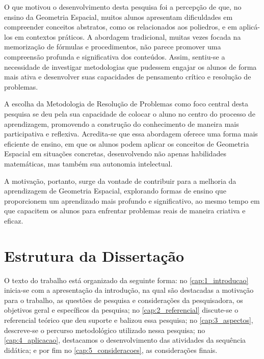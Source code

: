 O que motivou o desenvolvimento desta pesquisa foi a percepção de que, no ensino da Geometria Espacial, muitos alunos apresentam dificuldades em compreender conceitos abstratos, como os relacionados aos poliedros, e em aplicá-los em contextos práticos. A abordagem tradicional, muitas vezes focada na memorização de fórmulas e procedimentos, não parece promover uma compreensão profunda e significativa dos conteúdos. Assim, sentiu-se a necessidade de investigar metodologias que pudessem engajar os alunos de forma mais ativa e desenvolver suas capacidades de pensamento crítico e resolução de problemas.

A escolha da Metodologia de Resolução de Problemas como foco central desta pesquisa se deu pela sua capacidade de colocar o aluno no centro do processo de aprendizagem, promovendo a construção do conhecimento de maneira mais participativa e reflexiva. Acredita-se que essa abordagem oferece uma forma mais eficiente de ensino, em que os alunos podem aplicar os conceitos de Geometria Espacial em situações concretas, desenvolvendo não apenas habilidades matemáticas, mas também sua autonomia intelectual.

A motivação, portanto, surge da vontade de contribuir para a melhoria da aprendizagem de Geometria Espacial, explorando formas de ensino que proporcionem um aprendizado mais profundo e significativo, ao mesmo tempo em que capacitem os alunos para enfrentar problemas reais de maneira criativa e eficaz.

\section{Estrutura da Dissertação}

O texto do trabalho está organizado da seguinte forma: no \autoref{cap:1_introducao} inicia-se com a apresentação da introdução, na qual são destacadas a motivação para o trabalho, as questões de pesquisa e considerações da pesquisadora, os objetivos geral e específicos da pesquisa; no \autoref{cap:2_referencial} discute-se o referencial teórico que deu suporte e balizou essa pesquisa; no \autoref{cap:3_aspectos}, descreve-se o percurso metodológico utilizado nessa pesquisa; no \autoref{cap:4_aplicacao}, destacamos o desenvolvimento das atividades da sequência didática; e por fim no \autoref{cap:5_consideracoes}, as considerações finais.



